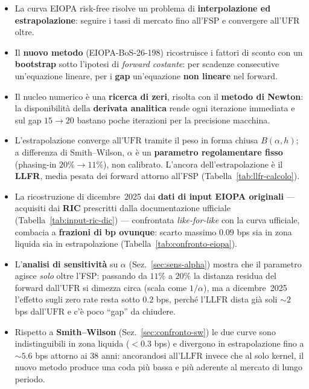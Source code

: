 \documentclass[11pt,a4paper]{article}
\theoremstyle{plain}
\theoremstyle{definition}
\theoremstyle{remark}
\newcommand{\UFR}{\mathrm{UFR}}
\newcommand{\LLFR}{\mathrm{LLFR}}
\begin{document}
\begin{itemize}
  \item La curva EIOPA risk-free risolve un problema di \textbf{interpolazione ed
        estrapolazione}: seguire i tassi di mercato fino all'FSP e convergere all'$\UFR$ oltre.
  \item Il \textbf{nuovo metodo} (EIOPA-BoS-26-198) ricostruisce i fattori di sconto con un
        \textbf{bootstrap} sotto l'ipotesi di \emph{forward costante}: per scadenze consecutive
        un'equazione lineare, per i \textbf{gap} un'equazione \textbf{non lineare} nel forward.
  \item Il nucleo numerico \`e una \textbf{ricerca di zeri}, risolta con il \textbf{metodo di
        Newton}: la disponibilit\`a della \textbf{derivata analitica} rende ogni iterazione
        immediata e sul gap $15\!\to\!20$ bastano poche iterazioni per la precisione macchina.
  \item L'estrapolazione converge all'$\UFR$ tramite il peso in forma chiusa $B(\alpha,h)$;
        a differenza di Smith--Wilson, $\alpha$ \`e un \textbf{parametro regolamentare fisso}
        (phasing-in $20\%\!\to\!11\%$), non calibrato. L'ancora dell'estrapolazione \`e il
        \textbf{LLFR}, media pesata dei forward attorno all'FSP (Tabella~\ref{tab:llfr-calcolo}).
  \item La ricostruzione di dicembre~2025 dai \textbf{dati di input EIOPA originali} ---
        acquisiti dai \textbf{RIC} prescritti dalla documentazione ufficiale
        (Tabella~\ref{tab:input-ric-dic}) --- confrontata \emph{like-for-like} con la curva
        ufficiale, combacia a \textbf{frazioni di bp ovunque}: scarto massimo $0.09$ bps sia
        in zona liquida sia in estrapolazione (Tabella~\ref{tab:confronto-eiopa}).
  \item L'\textbf{analisi di sensitivit\`a} su $\alpha$ (Sez.~\ref{sec:sens-alpha}) mostra che
        il parametro agisce \emph{solo} oltre l'FSP: passando da $11\%$ a $20\%$ la distanza
        residua del forward dall'$\UFR$ si dimezza circa (scala come $1/\alpha$), ma a
        dicembre~2025 l'effetto sugli zero rate resta sotto $0.2$ bps, perch\'e l'$\LLFR$ dista
        gi\`a soli $\sim\!2$ bps dall'$\UFR$ e c'\`e poco ``gap'' da chiudere.
  \item Rispetto a \textbf{Smith--Wilson} (Sez.~\ref{sec:confronto-sw}) le due curve sono
        indistinguibili in zona liquida ($<0.3$ bps) e divergono in estrapolazione fino a
        $\sim\!5.6$ bps attorno ai 38 anni: ancorandosi all'$\LLFR$ invece che al solo kernel,
        il nuovo metodo produce una coda pi\`u bassa e pi\`u aderente al mercato di lungo periodo.
\end{itemize}
\end{document}
